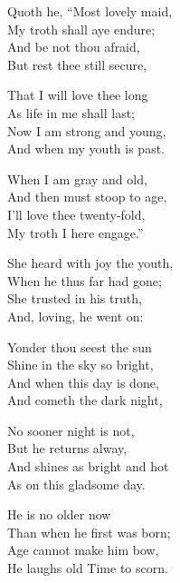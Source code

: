 \settowidth{\versewidth}{And shines as bright and hot}
\begin{dcverse}\begin{altverse}
Quoth he, “Most lovely maid,\\
My troth shall aye endure;\\
And be not thou afraid,\\
But rest thee still secure,
\end{altverse}

\begin{altverse}
That I will love thee long\\
As life in me shall last;\\
Now I am strong and young,\\
And when my youth is past.
\end{altverse}

\begin{altverse}
When I am gray and old,\\
And then must stoop to age,\\
I’ll love thee twenty-fold,\\
My troth I here engage.”
\end{altverse}

\begin{altverse}
She heard with joy the youth,\\
When he thus far had gone;\\
She trusted in his truth,\\
And, loving, he went on:
\end{altverse}

\begin{altverse}
Yonder thou seest the sun\\
Shine in the sky so bright,\\
And when this day is done,\\
And cometh the dark night,
\end{altverse}

\begin{altverse}
No sooner night is not,\\
But he returns alway,\\
And shines as bright and hot\\
As on this gladsome day.
\end{altverse}

\begin{altverse}
He is no older now\\
Than when he first was born;\\
Age cannot make him bow,\\
He laughs old Time to scorn.
\end{altverse}


\end{dcverse}
